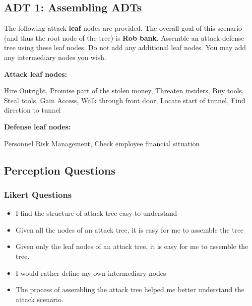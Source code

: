 \subsection{ADT 1: Assembling ADTs}

The following attack \textbf{leaf} nodes are provided. The overall goal of this scenario (and thus the root node of the tree) is \textbf{Rob bank}. Assemble an attack-defense tree using these leaf nodes. Do not add any additional leaf nodes. You may add any intermediary nodes you wish.

\textbf{Attack leaf nodes:}


Hire Outright, Promise part of the stolen money, Threaten insiders, Buy tools, Steal tools, Gain Access, Walk through front door, Locate start of tunnel, Find direction to tunnel

\textbf{Defense leaf nodes:}

Personnel Risk Management, Check employee financial situation


\subsection*{Perception Questions}


\subsubsection{Likert Questions}
\begin{itemize}
  \setlength{\itemindent}{\qIndent}
  \item[\surveyq{LS-ADT1-L1}] I find the structure of attack tree easy to understand
  \item[\surveyq{LS-ADT1-L2}] Given all the nodes of an attack tree, it is easy for me to assemble the tree
  \item[\surveyq{LS-ADT1-L3}] Given only the leaf nodes of an attack tree, it is easy for me to assemble the tree.
  \item[\surveyq{LS-ADT1-L4}] I would rather define my own intermediary nodes
  \item[\surveyq{LS-ADT1-L5}] The process of assembling the attack tree helped me better understand the attack scenario.
\end{itemize}

